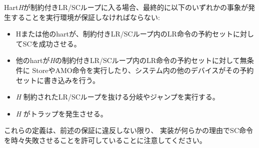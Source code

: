 \begin{comment}
If a hart {\em H} enters a constrained LR/SC loop, the execution environment
must guarantee that one of the following events eventually occurs:
\vspace{-0.2in}
\begin{itemize}
\parskip 0pt
\itemsep 1pt
\item {\em H} or some other hart executes a successful SC to the reservation
  set of the LR instruction in {\em H}'s constrained LR/SC loops.
\item Some other hart executes an unconditional store or AMO instruction to
  the reservation set of the LR instruction in {\em H}'s constrained LR/SC
  loop, or some other device in the system writes to that reservation set.
\item {\em H} executes a branch or jump that exits the constrained LR/SC loop.
\item {\em H} traps.
\end{itemize}
\end{comment}

Hart{\em H}が制約付きLR/SCループに入る場合、最終的に以下のいずれかの事象が発生することを実行環境が保証しなければならない:
\vspace{-0.2in}
\begin{itemize}
\parskip 0pt
\itemsep 1pt
\item Hまたは他のhartが、制約付きLR/SCループ内のLR命令の予約セットに対してSCを成功させる。
\item 他のhartが{\em H}の制約付きLR/SCループ内のLR命令の予約セットに対して無条件に
StoreやAMO命令を実行したり、システム内の他のデバイスがその予約セットに書き込みを行う。
\item {\em H} 制約されたLR/SCループを抜ける分岐やジャンプを実行する。
\item {\em H} がトラップを発生させる。
\end{itemize}

\begin{commentary}
\begin{comment}
Note that these definitions permit an implementation to fail an SC instruction
occasionally for any reason, provided the aforementioned guarantee is not
violated.
\end{comment}
これらの定義は、前述の保証に違反しない限り、
実装が何らかの理由でSC命令を時々失敗させることを許可していることに注意してください。
\end{commentary}

